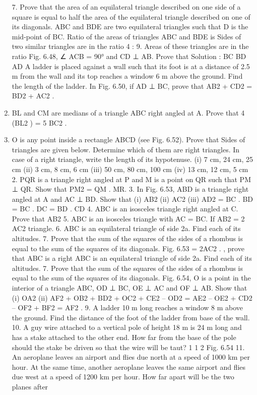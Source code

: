 \begin{enumerate}[label=\arabic*.,ref=\thesubsection.\theenumi]
7. Prove that the area of an equilateral triangle described on one side of a square is equal to half the area of the equilateral triangle described on one of its diagonals.
ABC and BDE are two equilateral triangles such that D is the mid-point of BC. Ratio of the areas of triangles ABC and BDE is
Sides of two similar triangles are in the ratio 4 : 9. Areas of these triangles are in the ratio
Fig. 6.48, ∠ ACB = 90° and CD ⊥ AB. Prove that Solution :
BC BD AD
A ladder is placed against a wall such that its foot is at a distance of 2.5 m from the wall and its top reaches a window 6 m above the ground. Find the length of the ladder.
In Fig. 6.50, if AD ⊥ BC, prove that AB2
+ CD2 = BD2 + AC2 .
\item BL and CM are medians of a triangle ABC right angled at A. Prove that 4 (BL2
) = 5 BC2 .
\item O is any point inside a rectangle ABCD (see Fig. 6.52). Prove that
Sides of triangles are given below. Determine which of them are right triangles. In case of a right triangle, write the length of its hypotenuse. (i) 7 cm, 24 cm, 25 cm (ii) 3 cm, 8 cm, 6 cm (iii) 50 cm, 80 cm, 100 cm (iv) 13 cm, 12 cm, 5 cm
2. PQR is a triangle right angled at P and M is a point on QR such that PM ⊥ QR. Show that PM2
= QM . MR.
3. In Fig. 6.53, ABD is a triangle right angled at A and AC ⊥ BD. Show that
(i) AB2 (ii) AC2 (iii) AD2
= BC . BD = BC . DC = BD . CD
4. ABC is an isosceles triangle right angled at C. Prove that AB2 5. ABC is an isosceles triangle with AC = BC. If AB2
= 2 AC2 triangle.
6. ABC is an equilateral triangle of side 2a. Find each of its altitudes. 7. Prove that the sum of the squares of the sides of a rhombus is equal to the sum of the squares of its diagonals.
Fig. 6.53 = 2AC2
. , prove that ABC is a right
ABC is an equilateral triangle of side 2a. Find each of its altitudes. 7. Prove that the sum of the squares of the sides of a rhombus is equal to the sum of the squares of its diagonals.
Fig. 6.54, O is a point in the interior of a triangle ABC, OD ⊥ BC, OE ⊥ AC and OF ⊥ AB. Show that
(i) OA2 (ii) AF2
+ OB2 + BD2
+ OC2 + CE2
– OD2 = AE2
– OE2 + CD2
– OF2 + BF2
= AF2 .
9. A ladder 10 m long reaches a window 8 m above the ground. Find the distance of the foot of the ladder from base of the wall.
10. A guy wire attached to a vertical pole of height 18 m is 24 m long and has a stake attached to the other end. How far from the base of the pole should the stake be driven so that the wire will be taut?
1
1 2
Fig. 6.54
11. An aeroplane leaves an airport and flies due north at a speed of 1000 km per hour. At the same time, another aeroplane leaves the same airport and flies due west at a speed of 1200 km per hour. How far apart will be the two planes after

\end{enumerate}
